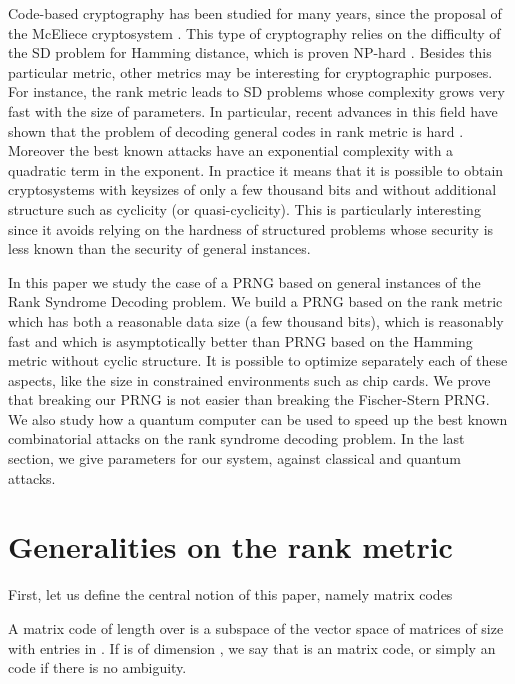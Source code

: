 \documentclass[11pt, a4paper]{llncs}
\begin{document}
Code-based cryptography has been studied for many years, since the proposal of the McEliece cryptosystem \cite{M78}. This type of cryptography relies on the difficulty of the SD problem for Hamming distance, which is proven NP-hard \cite{BMT78}. Besides this particular metric, other metrics may be interesting for cryptographic purposes. For instance, the rank metric 
leads to SD problems whose complexity grows very fast with the size of parameters. In particular, recent advances in this field have shown that the problem of decoding general codes in rank metric is hard \cite{GZ14}. Moreover  the best known attacks have an exponential complexity with a quadratic term in the exponent. In practice it means that it is possible to obtain cryptosystems
with keysizes of  only a few thousand bits and without additional structure such as cyclicity (or quasi-cyclicity). 
This is particularly interesting since it avoids 
relying on the hardness of structured problems whose security is less known than the security of general instances. 


In this paper we study the case of a PRNG based on general instances of the Rank Syndrome Decoding problem. We build a PRNG based on the rank metric which has both a reasonable data size (a few thousand bits), which  is reasonably fast and which is asymptotically better than PRNG based on the Hamming metric without cyclic structure. It is possible to optimize separately each of these aspects, like the size in constrained environments such as chip cards. We prove that breaking our PRNG is not easier than breaking the Fischer-Stern PRNG\cite{FS86}. We also study how a  quantum computer can be used to speed  up the best known combinatorial attacks on the rank syndrome decoding  problem. In the last section, we give parameters for our system, against classical and quantum attacks.
 
\section{Generalities on the rank metric}
First, let us define the central notion of this paper, namely matrix codes

\begin{definition} 
A matrix code  of length  over
 is a subspace of the vector space of matrices  of size  with entries in . 
If  is of dimension , we say that  is an  matrix code, or simply an  code if there is
no ambiguity.
\end{definition}
\end{document}
